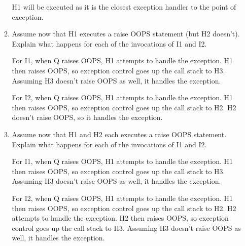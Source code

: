 \documentclass[12pt,letterpaper]{article}
\begin{document}
\begin{enumerate}
\begin{enumerate}
            H1 will be executed as it is the closest exception handler to the point of exception.

          \item
            Assume now that H1 executes a raise OOPS statement (but H2 doesn't).
            Explain what happens for each of the invocations of I1 and I2.

            For I1, when Q raises OOPS, H1 attempts to handle the exception.
            H1 then raises OOPS, so exception control goes up the call stack to H3.
            Assuming H3 doesn't raise OOPS as well, it handles the exception.

            For I2, when Q raises OOPS, H1 attempts to handle the exception.
            H1 then raises OOPS, so exception control goes up the call stack to H2.
            H2 doesn't raise OOPS, so it handles the exception.

          \item
            Assume now that H1 and H2 each executes a raise OOPS statement.
            Explain what happens for each of the invocations of I1 and I2.

            For I1, when Q raises OOPS, H1 attempts to handle the exception.
            H1 then raises OOPS, so exception control goes up the call stack to H3.
            Assuming H3 doesn't raise OOPS as well, it handles the exception.

            For I2, when Q raises OOPS, H1 attempts to handle the exception.
            H1 then raises OOPS, so exception control goes up the call stack to H2.
            H2 attempts to handle the exception.
            H2 then raises OOPS, so exception control goes up the call stack to H3.
            Assuming H3 doesn't raise OOPS as well, it handles the exception.
        \end{enumerate}
  \end{enumerate}
\end{document}
